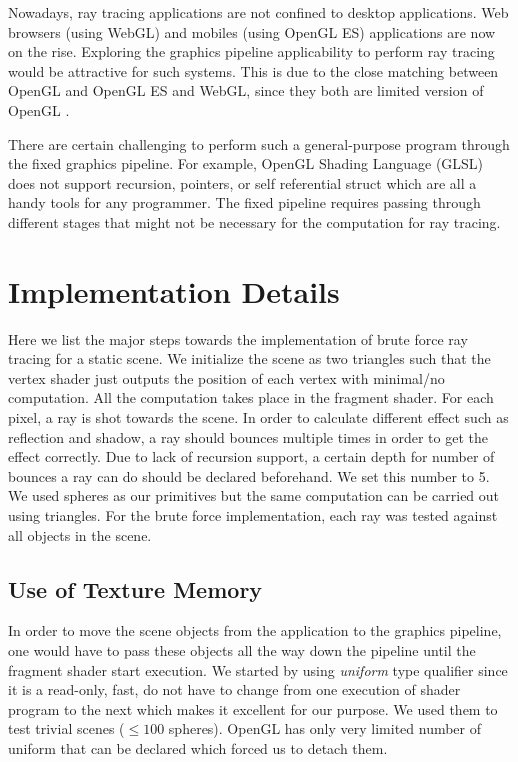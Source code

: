 \documentclass[a4paper,10pt]{article}
\begin{document}
Nowadays, ray tracing applications are not confined to desktop applications. Web browsers (using WebGL) and mobiles (using OpenGL ES) applications are now on the rise. Exploring the graphics pipeline applicability to perform ray tracing would be attractive for such systems. This is due to the close matching between OpenGL and OpenGL ES and WebGL, since they both are limited version of OpenGL \cite{hachisuka2015implementing}.

There are certain challenging to perform such a general-purpose program through the fixed graphics pipeline. For example, OpenGL Shading Language (GLSL) does not support recursion, pointers, or self referential struct which are all a handy tools for any programmer. The fixed pipeline requires passing through different stages that might not be necessary for the computation for ray tracing. 

\section{Implementation Details}
Here we list the major steps towards the implementation of brute force ray tracing for a static scene. We initialize the scene as two triangles such that the vertex shader just outputs the position of each vertex with minimal/no computation. All the computation takes place in the fragment shader. For each pixel, a ray is shot towards the scene. In order to calculate different effect such as reflection and shadow, a ray should bounces multiple times in order to get the effect correctly. Due to lack of recursion support, a certain depth for number of bounces a ray can do should be declared beforehand. We set this number to 5. We used spheres as our primitives but the same computation can be carried out using triangles. For the brute force implementation, each ray was tested against all objects in the scene. 

\subsection{Use of Texture Memory}
In order to move the scene objects from the application to the graphics pipeline, one would have to pass these objects all the way down the pipeline until the fragment shader start execution. We started by using \emph{uniform} type qualifier since it is a read-only, fast, do not have to change from one execution of shader program to the next which makes it excellent for our purpose. We used them to test trivial scenes ($\leq 100$ spheres). OpenGL has only very limited number of uniform that can be declared which forced us to detach them. 
\end{document}

